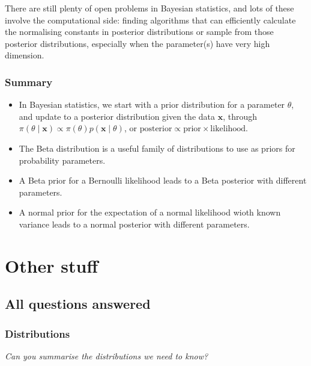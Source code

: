 \documentclass[
  letterpaper,
  DIV=11,
  numbers=noendperiod]{scrreprt}
\providecommand{\tightlist}{%
  \setlength{\itemsep}{0pt}\setlength{\parskip}{0pt}}\usepackage{longtable,booktabs,array}
\theoremstyle{remark}
\begin{document}
There are still plenty of open problems in Bayesian statistics, and lots
of these involve the computational side: finding algorithms that can
efficiently calculate the normalising constants in posterior
distributions or sample from those posterior distributions, especially
when the parameter(s) have very high dimension.

\hypertarget{summary-10}{%
\section*{Summary}\label{summary-10}}


\begin{itemize}
\tightlist
\item
  In Bayesian statistics, we start with a prior distribution for a
  parameter \(\theta\), and update to a posterior distribution given the
  data \(\mathbf x\), through
  \(\pi(\theta \mid \mathbf x) \propto \pi(\theta)p(\mathbf x \mid \theta)\),
  or \(\text{posterior} \propto \text{prior} \times \text{likelihood}\).
\item
  The Beta distribution is a useful family of distributions to use as
  priors for probability parameters.
\item
  A Beta prior for a Bernoulli likelihood leads to a Beta posterior with
  different parameters.
\item
  A normal prior for the expectation of a normal likelihood wioth known
  variance leads to a normal posterior with different parameters.
\end{itemize}

\part{Other stuff}

\hypertarget{L21-questions}{%
\chapter{All questions answered}\label{L21-questions}}

\hypertarget{faq-R-RV}{%
\section{Distributions}\label{faq-R-RV}}

\emph{Can you summarise the distributions we need to know?}
\end{document}
